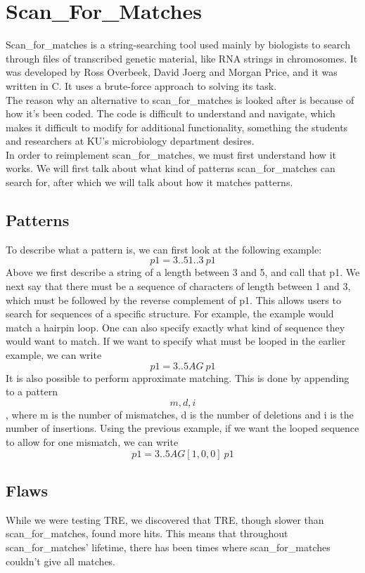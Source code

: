 \documentclass[11pt,twoside,a4paper]{article}
\begin{document}
\section{Scan\_For\_Matches}
Scan\_for\_matches is a string-searching tool used mainly by biologists to 
search through files of transcribed genetic material, like RNA strings in 
chromosomes. It was developed by Ross Overbeek, David Joerg and Morgan Price, 
and it was written in C. It uses a brute-force approach to solving its task.\\
The reason why an alternative to scan\_for\_matches is looked after is because 
of how it's been coded. The code is difficult to understand and navigate, 
which makes it difficult to modify for additional functionality, something the 
students and researchers at KU's microbiology department desires.\\
In order to reimplement scan\_for\_matches, we must first understand how 
it works. We will first talk about what kind of patterns scan\_for\_matches can 
search for, after which we will talk about how it matches patterns.
\subsection{Patterns}
To describe what a pattern is, we can first look at the following example:
$$p1=3..5 1..3 ~p1$$
Above we first describe a string of a length between 3 and 5, and call that 
p1. We next say that there must be a sequence of characters of length between 1 and 3, 
which must be followed by the reverse complement of p1. This allows users to 
search for sequences of a specific structure. For example, the example would 
match a hairpin loop. One can also specify exactly what kind of sequence 
they would want to match. If we want to specify what must be looped in the earlier 
example, we can write $$p1=3..5 AG ~p1$$
It is also possible to perform approximate matching. This is done by appending 
to a pattern \[m,d,i\], where m is the number of mismatches, d is the number 
of deletions and i is the number of insertions. Using the previous example, 
if we want the looped sequence to allow for one mismatch, we can write 
$$p1=3..5 AG[1,0,0] ~p1$$
\subsection{Flaws}
While we were testing TRE, we discovered that TRE, though slower than scan\_for\_matches, 
found more hits. This means that throughout scan\_for\_matches' lifetime, 
there has been times where scan\_for\_matches couldn't give all matches. 
\end{document}
